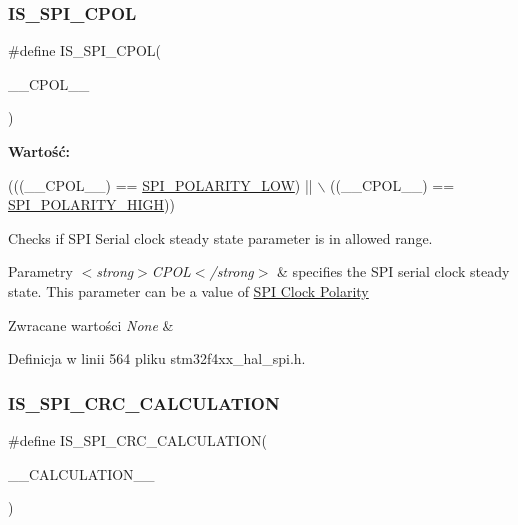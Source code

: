 \subsubsection{\texorpdfstring{I\+S\+\_\+\+S\+P\+I\+\_\+\+C\+P\+OL}{IS\_SPI\_CPOL}}
{\footnotesize\ttfamily \#define I\+S\+\_\+\+S\+P\+I\+\_\+\+C\+P\+OL(\begin{DoxyParamCaption}\item[{}]{\+\_\+\+\_\+\+C\+P\+O\+L\+\_\+\+\_\+ }\end{DoxyParamCaption})}

{\bfseries Wartość\+:}
\begin{DoxyCode}
(((\_\_CPOL\_\_) == \hyperlink{group___s_p_i___clock___polarity_gaf61e3c6ec671baef099516265793c8df}{SPI\_POLARITY\_LOW}) || \(\backslash\)
                               ((\_\_CPOL\_\_) == \hyperlink{group___s_p_i___clock___polarity_ga6910e2527b7511eb3a55946b9b775cff}{SPI\_POLARITY\_HIGH}))
\end{DoxyCode}


Checks if S\+PI Serial clock steady state parameter is in allowed range. 


\begin{DoxyParams}{Parametry}
{\em $<$strong$>$\+C\+P\+O\+L$<$/strong$>$} & specifies the S\+PI serial clock steady state. This parameter can be a value of \hyperlink{group___s_p_i___clock___polarity}{S\+PI Clock Polarity} \\
\hline
\end{DoxyParams}

\begin{DoxyRetVals}{Zwracane wartości}
{\em None} & \\
\hline
\end{DoxyRetVals}


Definicja w linii 564 pliku stm32f4xx\+\_\+hal\+\_\+spi.\+h.

\mbox{\label{group___s_p_i___private___macros_ga5416429a2e9024b142c972eacb1fd021}} 
\subsubsection{\texorpdfstring{I\+S\+\_\+\+S\+P\+I\+\_\+\+C\+R\+C\+\_\+\+C\+A\+L\+C\+U\+L\+A\+T\+I\+ON}{IS\_SPI\_CRC\_CALCULATION}}
{\footnotesize\ttfamily \#define I\+S\+\_\+\+S\+P\+I\+\_\+\+C\+R\+C\+\_\+\+C\+A\+L\+C\+U\+L\+A\+T\+I\+ON(\begin{DoxyParamCaption}\item[{}]{\+\_\+\+\_\+\+C\+A\+L\+C\+U\+L\+A\+T\+I\+O\+N\+\_\+\+\_\+ }\end{DoxyParamCaption})}

